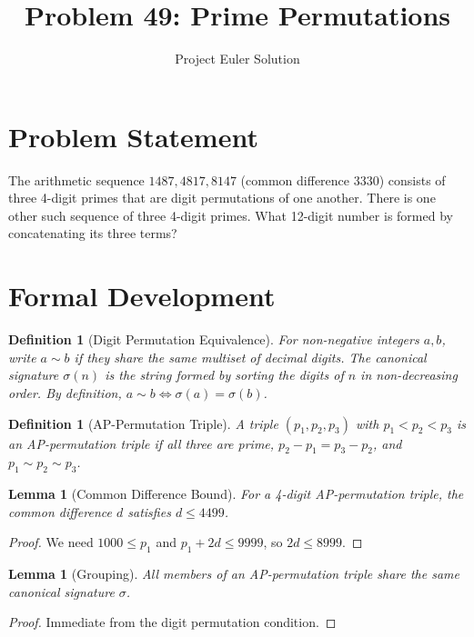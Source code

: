 \documentclass[12pt]{article}
\title{Problem 49: Prime Permutations}
\author{Project Euler Solution}
\date{}
\newtheorem{lemma}[theorem]{Lemma}
\newtheorem{definition}[theorem]{Definition}
\begin{document}
\maketitle

\section{Problem Statement}

The arithmetic sequence $1487, 4817, 8147$ (common difference $3330$) consists of three 4-digit primes that are digit permutations of one another. There is one other such sequence of three 4-digit primes. What 12-digit number is formed by concatenating its three terms?

\section{Formal Development}

\begin{definition}[Digit Permutation Equivalence]
For non-negative integers $a, b$, write $a \sim b$ if they share the same multiset of decimal digits. The \emph{canonical signature} $\sigma(n)$ is the string formed by sorting the digits of $n$ in non-decreasing order. By definition, $a \sim b \iff \sigma(a) = \sigma(b)$.
\end{definition}

\begin{definition}[AP-Permutation Triple]
A triple $(p_1, p_2, p_3)$ with $p_1 < p_2 < p_3$ is an \emph{AP-permutation triple} if all three are prime, $p_2 - p_1 = p_3 - p_2$, and $p_1 \sim p_2 \sim p_3$.
\end{definition}

\begin{lemma}[Common Difference Bound]\label{lem:dbound}
For a 4-digit AP-permutation triple, the common difference $d$ satisfies $d \leq 4499$.
\end{lemma}

\begin{proof}
We need $1000 \leq p_1$ and $p_1 + 2d \leq 9999$, so $2d \leq 8999$.
\end{proof}

\begin{lemma}[Grouping]\label{lem:group}
All members of an AP-permutation triple share the same canonical signature $\sigma$.
\end{lemma}

\begin{proof}
Immediate from the digit permutation condition.
\end{proof}
\end{document}
